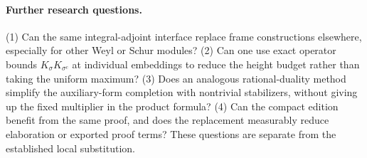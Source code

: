\documentclass[11pt]{article}
\theoremstyle{remark}\newtheorem{remark}[theorem]{Remark}
\begin{document}
\paragraph{Further research questions.} (1) Can the same integral-adjoint interface replace frame constructions elsewhere, especially for other Weyl or Schur modules? (2) Can one use exact operator bounds $K_\sigma K_{\sigma^c}$ at individual embeddings to reduce the height budget rather than taking the uniform maximum? (3) Does an analogous rational-duality method simplify the auxiliary-form completion with nontrivial stabilizers, without giving up the fixed multiplier in the product formula? (4) Can the compact edition benefit from the same proof, and does the replacement measurably reduce elaboration or exported proof terms? These questions are separate from the established local substitution.
\end{document}
